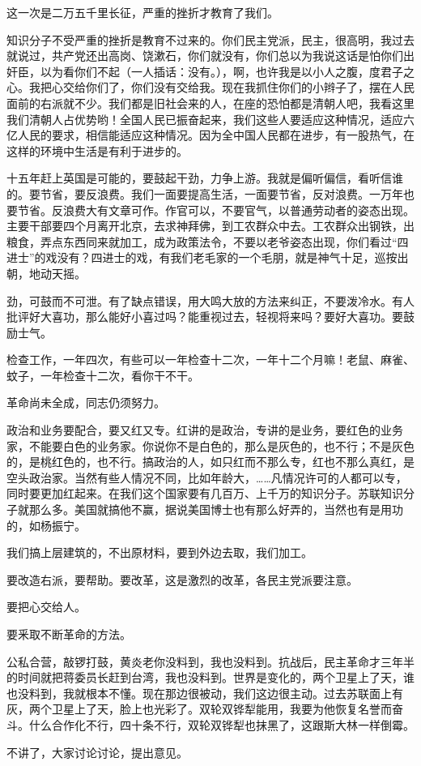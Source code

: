 这一次是二万五千里长征，严重的挫折才教育了我们。

知识分子不受严重的挫折是教育不过来的。你们民主党派，民主，很高明，我过去就说过，共产党还出高岗、饶漱石，你们就没有，你们总以为我说这话是怕你们出奸臣，以为看你们不起（一人插话：没有。），啊，也许我是以小人之腹，度君子之心。我把心交给你们了，你们没有交给我。现在我抓住你们的小辫子了，摆在人民面前的右派就不少。我们都是旧社会来的人，在座的恐怕都是清朝人吧，我看这里我们清朝人占优势哟！全国人民已振奋起来，我们这些人要适应这种情况，适应六亿人民的要求，相信能适应这种情况。因为全中国人民都在进步，有一股热气，在这样的环境中生活是有利于进步的。

十五年赶上英国是可能的，要鼓起干劲，力争上游。我就是偏听偏信，看听信谁的。要节省，要反浪费。我们一面要提高生活，一面要节省，反对浪费。一万年也要节省。反浪费大有文章可作。作官可以，不要官气，以普通劳动者的姿态出现。主要干部要四个月离开北京，去求神拜佛，到工农群众中去。工农群众出钢铁，出粮食，弄点东西同来就加工，成为政策法令，不要以老爷姿态出现，你们看过“四进士”的戏没有？四进士的戏，有我们老毛家的一个毛朋，就是神气十足，巡按出朝，地动天摇。

劲，可鼓而不可泄。有了缺点错误，用大鸣大放的方法来纠正，不要泼冷水。有人批评好大喜功，那么能好小喜过吗？能重视过去，轻视将来吗？要好大喜功。要鼓励士气。

检查工作，一年四次，有些可以一年检查十二次，一年十二个月嘛！老鼠、麻雀、蚊子，一年检查十二次，看你干不干。

革命尚未全成，同志仍须努力。

政治和业务要配合，要又红又专。红讲的是政治，专讲的是业务，要红色的业务家，不能要白色的业务家。你说你不是白色的，那么是灰色的，也不行；不是灰色的，是桃红色的，也不行。搞政治的人，如只红而不那么专，红也不那么真红，是空头政治家。当然有些人情况不同，比如年龄大，……凡情况许可的人都可以专，同时要更加红起来。在我们这个国家要有几百万、上千万的知识分子。苏联知识分子就那么多。美国就搞他不赢，据说美国博士也有那么好弄的，当然也有是用功的，如杨振宁。

我们搞上层建筑的，不出原材料，要到外边去取，我们加工。

要改造右派，要帮助。要改革，这是激烈的改革，各民主党派要注意。

要把心交给人。

要釆取不断革命的方法。

公私合营，敲锣打鼓，黄炎老你没料到，我也没料到。抗战后，民主革命才三年半的时间就把蒋委员长赶到台湾，我也没料到。世界是变化的，两个卫星上了天，谁也没料到，我就根本不懂。现在那边很被动，我们这边很主动。过去苏联面上有灰，两个卫星上了天，脸上也光彩了。双轮双铧犁能用，我要为他恢复名誉而奋斗。什么合作化不行，四十条不行，双轮双铧犁也抹黑了，这跟斯大林一样倒霉。

不讲了，大家讨论讨论，提出意见。

